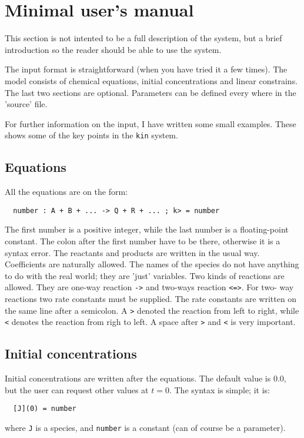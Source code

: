 \section{Minimal user's manual}
This section is not intented to be a full description of the system, but a brief introduction
so the reader should be able to use the system.

The input format is straightforward (when you have tried it a few times). The model
consists of chemical equations, initial concentrations and linear constrains. The last
two sections are optional. Parameters can be defined every where in the 'source'
file.

For further information on the input, I have written some small examples. These shows some of the
key points in the {\tt kin} system.

\subsection{Equations}
All the equations are on the form:
\begin{verbatim}
  number : A + B + ... -> Q + R + ... ; k> = number
\end{verbatim}
The first number is a positive integer, while the last number is a floating-point constant.
The colon after the first number have to be there, otherwise it is a syntax error. The reactants
and products are written in the usual way. Coefficients are naturally allowed. The names of the
species do not have anything to do with the real world; they are 'just' variables. Two kinds of
reactions are allowed. They are one-way reaction {\tt ->} and two-ways reaction {\tt <=>}. For two-
way reactions two rate constants must be supplied. The rate constants are written on the same line after a
semicolon. A {\tt >} denoted the reaction from left to right, while {\tt <} denotes the reaction from
righ to left. A space after {\tt >} and {\tt <} is very important.

\subsection{Initial concentrations}
Initial concentrations are written after the equations. The default value is $0.0$, but the user can
request other values at $t=0$. The syntax is simple; it is:
\begin{verbatim}
  [J](0) = number
\end{verbatim}
where {\tt J} is a species, and {\tt number} is a constant (can of course be a parameter). 

